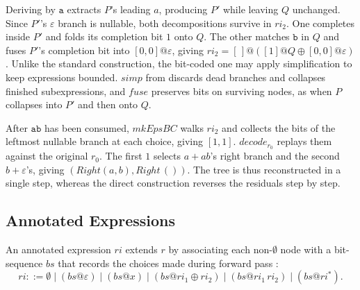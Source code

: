 Deriving by $\mathtt{a}$ extracts $P$'s leading $a$, 
producing $P'$ while leaving $Q$ unchanged. 
Since $P'$'s $\varepsilon$ branch is nullable, 
both decompositions survive in $\mathit{ri}_2$.
One completes inside $P'$ and folds its completion bit $1$ onto $Q$.
The other matches $\mathtt{b}$ in $Q$ 
and fuses $P'$'s completion bit into $[0,0]@\varepsilon$, 
giving $\mathit{ri}_2=[\,]@([1]@Q \oplus [0,0]@\varepsilon)$.
Unlike the standard construction, 
the bit-coded one may apply simplification to keep expressions bounded. 
$\mathit{simp}$ from \citep[Fig.~6]{sulzmannlu2014} 
discards dead branches and collapses finished subexpressions, 
and $\mathit{fuse}$ preserves bits on surviving nodes, 
as when $P$ collapses into $P'$ and then onto $Q$.

After $\mathtt{ab}$ has been consumed, 
$\mathit{mkEpsBC}$ walks $\mathit{ri}_2$ 
and collects the bits of the leftmost nullable branch at each choice, giving $[1,1]$. 
$\mathit{decode}_{r_0}$ replays them against the original $r_0$.
The first $1$ selects $a+ab$'s right branch and the second $b+\varepsilon$'s,
giving $(\mathit{Right}(a,b),\mathit{Right}\,())$. 
The tree is thus reconstructed in a single step, 
whereas the direct construction reverses the residuals step by step.

%
%
%

\subsection{Annotated Expressions}
\label{sec:annotated-expressions}

An annotated expression $\mathit{ri}$ extends $r$
by associating each non-$\emptyset$ node with a bit-sequence $bs$
that records the choices made during forward pass \citep[Fig.~5]{sulzmannlu2014}:
\begin{equation}\label{eq:aregex-grammar}
\mathit{ri} ::= \emptyset \mid (bs@\varepsilon) \mid (bs@x) \mid
(bs@\mathit{ri}_1 \oplus \mathit{ri}_2) \mid
(bs@\mathit{ri}_1\,\mathit{ri}_2) \mid
(bs@\mathit{ri}^{*}).
\end{equation}

%

